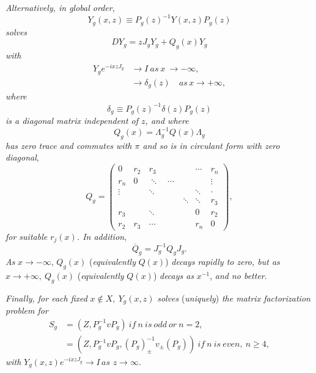 \documentclass{surv-l}
\theoremstyle{plain}
\theoremstyle{definition}
\numberwithin{equation}{chapter}
\begin{document}
\emph{Alternatively, in global order},
\begin{equation*}
Y_{g}(x, z)\equiv P_{g}(z)^{-1}Y(x, z)P_{g}(z)
\end{equation*}
\emph{solves}
\begin{equation}\label{eq38.35}
DY_{g}=zJ_{g}Y_{g}+ Q_{g}(x)Y_{g}
\end{equation}
\emph{with}
\begin{align}\label{eq38.36}
Y_{g}e^{-ixzJ_{g}}&\rightarrow I\ as\ x\ \rightarrow-\infty,\\
&\rightarrow \delta_{g}(z)\quad as \,x\rightarrow+\infty,\nonumber
\end{align}
\emph{where}
\begin{equation}\label{eq38.37}
\delta_{g}\equiv P_{g}(z)^{-1}\delta(z)P_{g}(z)
\end{equation}
\emph{is a diagonal matrix independent of $z$, and where}
\begin{equation}\label{eq38.38}
Q_{g}(x)=\Lambda_{g}^{-1}Q(x)\Lambda_{g}
\end{equation}
\emph{has zero trace and commutes with $\pi$ and so is in circulant form with zero diagonal},
\begin{equation*}
Q_{g}=\left(\begin{array}{ccccc}
0 & r_{2} & r_{3} & \cdots & r_{n}\\
r_{n} & 0 & \ddots\quad\cdots & \quad & \vdots\\
\vdots & \quad & \ddots & \ddots & \cdot\\
\quad & \quad &\quad\quad\qquad \ddots&\ddots & r_{3}\\
r_{3} & \quad & \ddots & 0 & r_{2}\\
r_{2} & r_{3} & \cdots & r_{n} & 0
\end{array}\right),
\end{equation*}
\emph{for suitable $r_{j}(x)$. In addition},
\begin{equation}\label{eq38.39}
\overline{Q}_{g}=J_{g}^{-1}Q_{g}J_{g}.
\end{equation}
\emph{As} $x\rightarrow-\infty,\, Q_{g}(x)$ (\emph{equivalently} $Q(x)$) \emph{decays rapidly to zero, but as} $x \rightarrow+\infty,\ Q_{g}(x)$ (\emph{equivalently} $Q(x)$) \emph{decays as} $x^{-1}$, \emph{and no better}.

\emph{Finally, for each fixed} $x\not\in X,\ Y_{g}(x, z)$ \emph{solves} (\emph{uniquely}) \emph{the matrix factorization problem for}
\begin{align*}
S_{g}&=(Z,P_{g}^{-1}vP_{g})\ \mathit{if\ n\ is\ odd\ or}\ n=2,\\
&= (Z, P_{g}^{-1}vP_{g},(P_{g})_{\pm}^{-1}v_{\pm}(P_{g}))\ \mathit{if\ n\ is\ even,}\ n \geq 4,
\end{align*}
\emph{with} $Y_{g}(x, z)e^{-ixzJ_{g}}\rightarrow I\,as$ $z\rightarrow\infty$.
\end{document}
